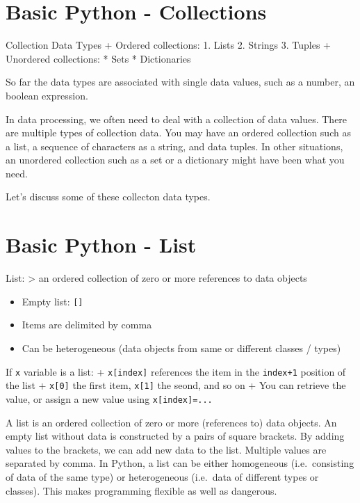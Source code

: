\documentclass[
  letterpaper,
]{scrbook}
\providecommand{\tightlist}{%
  \setlength{\itemsep}{0pt}\setlength{\parskip}{0pt}}
\begin{document}
\section*{Basic Python - Collections}\label{basic-python---collections}


Collection Data Types + Ordered collections: 1. Lists 2. Strings 3.
Tuples + Unordered collections: * Sets * Dictionaries

So far the data types are associated with single data values, such as a
number, an boolean expression.

In data processing, we often need to deal with a collection of data
values. There are multiple types of collection data. You may have an
ordered collection such as a list, a sequence of characters as a string,
and data tuples. In other situations, an unordered collection such as a
set or a dictionary might have been what you need.

Let's discuss some of these collecton data types.

\section*{Basic Python - List}\label{basic-python---list}


List: \textgreater{} an ordered collection of zero or more references to
data objects

\begin{itemize}
\tightlist
\item
  Empty list: \texttt{{[}{]}}
\item
  Items are delimited by comma
\item
  Can be heterogeneous (data objects from same or different classes /
  types)
\end{itemize}

If \texttt{x} variable is a list: + \texttt{x{[}index{]}} references the
item in the \texttt{index+1} position of the list + \texttt{x{[}0{]}}
the first item, \texttt{x{[}1{]}} the seond, and so on + You can
retrieve the value, or assign a new value using
\texttt{x{[}index{]}=...}

A list is an ordered collection of zero or more (references to) data
objects. An empty list without data is constructed by a pairs of square
brackets. By adding values to the brackets, we can add new data to the
list. Multiple values are separated by comma. In Python, a list can be
either homogeneous (i.e.~consisting of data of the same type) or
heterogeneous (i.e.~data of different types or classes). This makes
programming flexible as well as dangerous.
\end{document}
